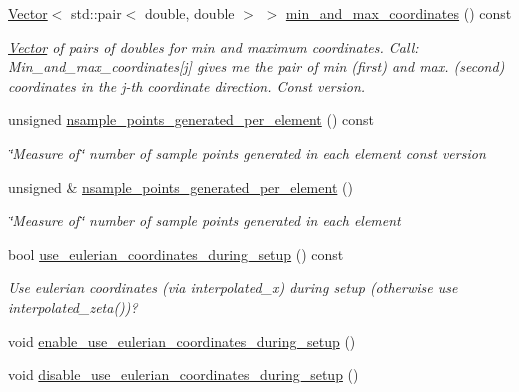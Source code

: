\begin{DoxyCompactItemize}
\hyperlink{classoomph_1_1Vector}{Vector}$<$ std\+::pair$<$ double, double $>$ $>$ \hyperlink{classoomph_1_1SamplePointContainerParameters_ad619df6bc0253178dbbaf195cea2fb5a}{min\+\_\+and\+\_\+max\+\_\+coordinates} () const
\begin{DoxyCompactList}\small\item\em \hyperlink{classoomph_1_1Vector}{Vector} of pairs of doubles for min and maximum coordinates. Call\+: Min\+\_\+and\+\_\+max\+\_\+coordinates\mbox{[}j\mbox{]} gives me the pair of min (first) and max. (second) coordinates in the j-\/th coordinate direction. Const version. \end{DoxyCompactList}\item 
unsigned \hyperlink{classoomph_1_1SamplePointContainerParameters_a710a6a32b2518b202a38fde405cdf7e5}{nsample\+\_\+points\+\_\+generated\+\_\+per\+\_\+element} () const
\begin{DoxyCompactList}\small\item\em \char`\"{}\+Measure of\char`\"{} number of sample points generated in each element const version \end{DoxyCompactList}\item 
unsigned \& \hyperlink{classoomph_1_1SamplePointContainerParameters_a645bbbfc9395e5fe39a05845b2352b99}{nsample\+\_\+points\+\_\+generated\+\_\+per\+\_\+element} ()
\begin{DoxyCompactList}\small\item\em \char`\"{}\+Measure of\char`\"{} number of sample points generated in each element \end{DoxyCompactList}\item 
bool \hyperlink{classoomph_1_1SamplePointContainerParameters_a946a3657f6c50f2e14dccf421ed5e178}{use\+\_\+eulerian\+\_\+coordinates\+\_\+during\+\_\+setup} () const
\begin{DoxyCompactList}\small\item\em Use eulerian coordinates (via interpolated\+\_\+x) during setup (otherwise use interpolated\+\_\+zeta())? \end{DoxyCompactList}\item 
void \hyperlink{classoomph_1_1SamplePointContainerParameters_a8aa712173bb8242b17e49df97c0072e3}{enable\+\_\+use\+\_\+eulerian\+\_\+coordinates\+\_\+during\+\_\+setup} ()
\item 
void \hyperlink{classoomph_1_1SamplePointContainerParameters_a9c59f44fa07b7f79e8b854d5b918e3bd}{disable\+\_\+use\+\_\+eulerian\+\_\+coordinates\+\_\+during\+\_\+setup} ()
\item 

\end{DoxyCompactItemize}
